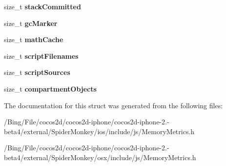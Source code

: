 \begin{DoxyCompactItemize}
\item 
\hypertarget{struct_j_s_1_1_runtime_sizes_a074ef148042f7d9bb46fc4f89b2e4423}{size\-\_\-t {\bfseries stack\-Committed}}\label{struct_j_s_1_1_runtime_sizes_a074ef148042f7d9bb46fc4f89b2e4423}

\item 
\hypertarget{struct_j_s_1_1_runtime_sizes_a27ba1e6418d2dc4776edec6fac515afb}{size\-\_\-t {\bfseries gc\-Marker}}\label{struct_j_s_1_1_runtime_sizes_a27ba1e6418d2dc4776edec6fac515afb}

\item 
\hypertarget{struct_j_s_1_1_runtime_sizes_a3d00badea05466e9cb8107b3a2892e7d}{size\-\_\-t {\bfseries math\-Cache}}\label{struct_j_s_1_1_runtime_sizes_a3d00badea05466e9cb8107b3a2892e7d}

\item 
\hypertarget{struct_j_s_1_1_runtime_sizes_aee2d41c6e6c1092b526d047519792236}{size\-\_\-t {\bfseries script\-Filenames}}\label{struct_j_s_1_1_runtime_sizes_aee2d41c6e6c1092b526d047519792236}

\item 
\hypertarget{struct_j_s_1_1_runtime_sizes_a77da31e6d912f7c18f5464f875f0e037}{size\-\_\-t {\bfseries script\-Sources}}\label{struct_j_s_1_1_runtime_sizes_a77da31e6d912f7c18f5464f875f0e037}

\item 
\hypertarget{struct_j_s_1_1_runtime_sizes_a4c9c6709d70c3e7bc530852580790434}{size\-\_\-t {\bfseries compartment\-Objects}}\label{struct_j_s_1_1_runtime_sizes_a4c9c6709d70c3e7bc530852580790434}

\end{DoxyCompactItemize}


The documentation for this struct was generated from the following files\-:\begin{DoxyCompactItemize}
\item 
/\-Bing/\-File/cocos2d/cocos2d-\/iphone/cocos2d-\/iphone-\/2.-\/beta4/external/\-Spider\-Monkey/ios/include/js/Memory\-Metrics.\-h\item 
/\-Bing/\-File/cocos2d/cocos2d-\/iphone/cocos2d-\/iphone-\/2.-\/beta4/external/\-Spider\-Monkey/osx/include/js/Memory\-Metrics.\-h\end{DoxyCompactItemize}
